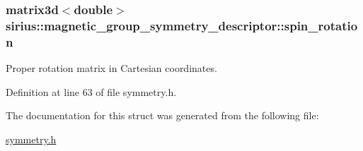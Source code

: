 \subsubsection[{spin\+\_\+rotation}]{\setlength{\rightskip}{0pt plus 5cm}matrix3d$<$double$>$ sirius\+::magnetic\+\_\+group\+\_\+symmetry\+\_\+descriptor\+::spin\+\_\+rotation}\label{structsirius_1_1magnetic__group__symmetry__descriptor_a6c47e5768e389872cae2b25ea05c5ef5}


Proper rotation matrix in Cartesian coordinates. 



Definition at line 63 of file symmetry.\+h.



The documentation for this struct was generated from the following file\+:\begin{DoxyCompactItemize}
\item 
\hyperlink{symmetry_8h}{symmetry.\+h}\end{DoxyCompactItemize}
